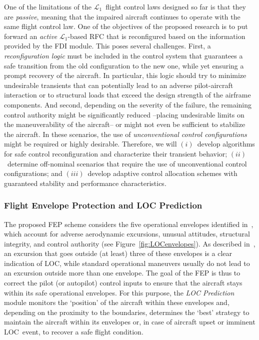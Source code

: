 \documentclass[letter,onecolumn,12pt]{aiaa-tc}
\newcommand{\Lone}{\mathcal{L}_1}
\begin{document}
One of the limitations of the $\Lone$~flight control laws designed so far is that they are \emph{passive}, meaning that the impaired aircraft continues to operate with the same flight control law. One of the objectives of the proposed research is to put forward an \emph{active} $\Lone$-based RFC that is reconfigured based on the information provided by the FDI module. This poses several challenges. First, a \emph{reconfiguration logic} must be included in the control system that guarantees a safe transition from the old configuration to the new one, while yet ensuring a prompt recovery of the aircraft. In particular, this logic should try to minimize undesirable transients that can potentially lead to an adverse pilot-aircraft interaction or to structural loads that exceed the design strength of the airframe components. And second, depending on the severity of the failure, the remaining control authority might be significantly reduced --placing undesirable limits on the maneuverability of the aircraft-- or might not even be sufficient to stabilize the aircraft. In these scenarios, the use of \emph{unconventional control configurations} might be required or highly desirable. Therefore, we will $(i)$~develop algorithms for safe control reconfiguration and characterize their transient behavior; $(ii)$~determine off-nominal scenarios that require the use of unconventional control configurations; and $(iii)$~develop adaptive control allocation schemes with guaranteed stability and performance characteristics.



\subsubsection{Flight Envelope Protection and LOC Prediction}

The proposed FEP scheme considers the five operational envelopes identified in~\cite{LOC04_LOCMetrics}, which account for adverse aerodynamic excursions, unusual attitudes, structural integrity, and control authority (see Figure~\ref{fig:LOCenvelopes}). As described in~\cite{LOC04_LOCMetrics}, an excursion that goes outside (at least) three of these envelopes is a clear indication of LOC, while standard operational maneuvers usually do not lead to an excursion outside more than one envelope. The goal of the FEP is thus to correct the pilot (or autopilot) control inputs to ensure that the aircraft stays within its safe operational envelopes. For this purpose, the \emph{LOC Prediction} module monitors the `position' of the aircraft within these envelopes and, depending on the proximity to the boundaries, determines the `best' strategy to maintain the aircraft within its envelopes or, in case of aircraft upset or imminent LOC~event, to recover a safe flight condition.
\end{document}

